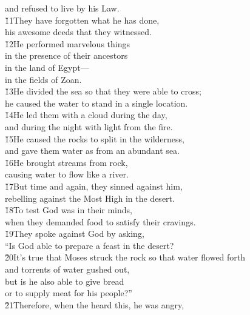 \begin{poetry}
\poemll    and refused to live by his Law. \\
\poeml \v{11}They have forgotten what he has done, \\
\poemll    his awesome deeds that they witnessed. \\
\poeml \v{12}He performed marvelous things \\
\poemll    in the presence of their ancestors \\
\poeml in the land of Egypt--- \\
\poemll    in the fields of Zoan. \\
\poeml \v{13}He divided the sea so that they were able to cross; \\
\poemll    he caused the water to stand in a single location. \\
\poeml \v{14}He led them with a cloud during the day, \\
\poemll    and during the night with light from the fire. \\
\poeml \v{15}He caused the rocks to split in the wilderness, \\
\poemll    and gave them water as from an abundant sea. \\
\poeml \v{16}He brought streams from rock, \\
\poemll    causing water to flow like a river. \\
\poeml \v{17}But time and again, they sinned against him, \\
\poemll    rebelling against the Most High in the desert. \\
\poeml \v{18}To test God was in their minds, \\
\poemll    when they demanded food to satisfy their cravings. \\
\poeml \v{19}They spoke against God by asking, \\
\poemll    ``Is God able to prepare a feast in the desert? \\
\poeml \v{20}It's true that Moses struck the rock so that water flowed forth \\
\poemll    and torrents of water gushed out, \\
\poeml but is he also able to give bread \\
\poemll    or to supply meat for his people?'' \\
\poeml \v{21}Therefore, when the  heard this, he was angry, \\

\end{poetry}
